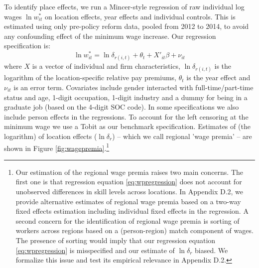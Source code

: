 To identify place effects, we run a Mincer-style regression of raw individual log wages $\ln w^*_{it}$ on location effects, year effects and individual controls. This is estimated using only pre-policy reform data, pooled from 2012 to 2014, to avoid any confounding effect of the minimum wage increase. Our regression specification is:
\begin{equation}\label{eq:wpregression}
    \ln w^*_{it}=\ln \delta_{r(i,t)} + \theta_t + X'_{it}\beta + \nu_{it}
\end{equation}
where $X$ is a vector of individual and firm characteristics,  $\ln \delta_{r(i,t)}$ is the logarithm of the location-specific relative pay premiums, $\theta_t$ is the year effect and $\nu_{it}$ is an error term. Covariates include gender interacted with full-time/part-time status and age, 1-digit occupation, 1-digit industry and a dummy for being in a graduate job (based on the 4-digit SOC code). In some specifications we also include person effects in the regressions. To account for the left censoring at the minimum wage we use a Tobit as our benchmark specification. Estimates of (the logarithm) of location effects ($\ln \delta_{r}$) -- which we call regional 'wage premia' -- are shown in Figure \ref{fig:wagepremia}.\footnote{Our estimation of the regional wage premia raises two main concerns. The first one is that regression equation \ref{eq:wpregression} does not account for unobserved differences in skill levels across locations. In Appendix D.2, we provide alternative estimates of regional wage premia based on a two-way fixed effects estimation including individual fixed effects in the regression. A second concern for the identification of regional wage premia is sorting of workers across regions based on a (person-region) match component of wages. The presence of sorting would imply that our regression equation \ref{eq:wpregression} is misspecified and our estimate of $\ln \delta_r$ biased. We formalize this issue and test its empirical relevance in Appendix D.2.}

